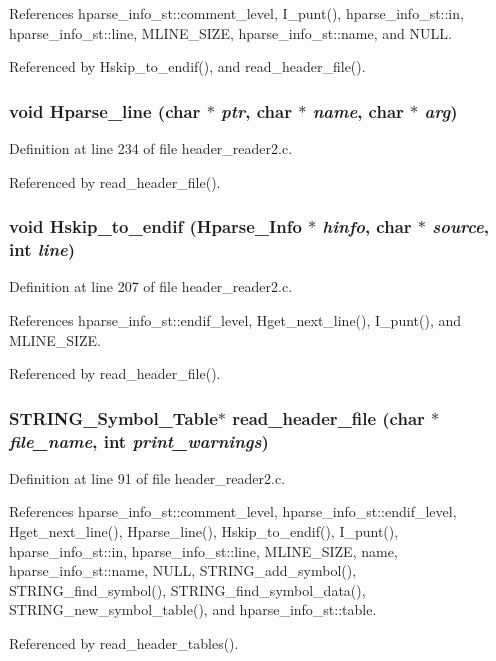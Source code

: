 References hparse\_\-info\_\-st::comment\_\-level, I\_\-punt(), hparse\_\-info\_\-st::in, hparse\_\-info\_\-st::line, MLINE\_\-SIZE, hparse\_\-info\_\-st::name, and NULL.

Referenced by Hskip\_\-to\_\-endif(), and read\_\-header\_\-file().
\subsubsection{\setlength{\rightskip}{0pt plus 5cm}void Hparse\_\-line (char $\ast$ {\em ptr}, char $\ast$ {\em name}, char $\ast$ {\em arg})}\label{header__reader2_8c_672ef2e32077cd2ca8eff3cb18b4166d}




Definition at line 234 of file header\_\-reader2.c.

Referenced by read\_\-header\_\-file().
\subsubsection{\setlength{\rightskip}{0pt plus 5cm}void Hskip\_\-to\_\-endif (\bf{Hparse\_\-Info} $\ast$ {\em hinfo}, char $\ast$ {\em source}, int {\em line})}\label{header__reader2_8c_8fc585b250c1ca25bc77a4960efd41f7}




Definition at line 207 of file header\_\-reader2.c.

References hparse\_\-info\_\-st::endif\_\-level, Hget\_\-next\_\-line(), I\_\-punt(), and MLINE\_\-SIZE.

Referenced by read\_\-header\_\-file().
\subsubsection{\setlength{\rightskip}{0pt plus 5cm}\bf{STRING\_\-Symbol\_\-Table}$\ast$ read\_\-header\_\-file (char $\ast$ {\em file\_\-name}, int {\em print\_\-warnings})}\label{header__reader2_8c_33574aec74728b493ce42679b1c18d10}




Definition at line 91 of file header\_\-reader2.c.

References hparse\_\-info\_\-st::comment\_\-level, hparse\_\-info\_\-st::endif\_\-level, Hget\_\-next\_\-line(), Hparse\_\-line(), Hskip\_\-to\_\-endif(), I\_\-punt(), hparse\_\-info\_\-st::in, hparse\_\-info\_\-st::line, MLINE\_\-SIZE, name, hparse\_\-info\_\-st::name, NULL, STRING\_\-add\_\-symbol(), STRING\_\-find\_\-symbol(), STRING\_\-find\_\-symbol\_\-data(), STRING\_\-new\_\-symbol\_\-table(), and hparse\_\-info\_\-st::table.

Referenced by read\_\-header\_\-tables().